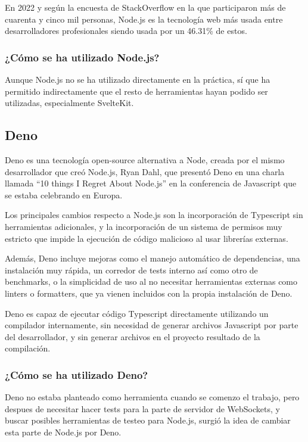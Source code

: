 En 2022 y según la encuesta de StackOverflow \cite{so_survey} en la que participaron más de cuarenta y cinco mil personas, Node.js es la tecnología web más usada entre desarrolladores profesionales siendo usada por un 46.31\% de estos.

\subsubsection{¿Cómo se ha utilizado Node.js?}
Aunque Node.js no se ha utilizado directamente en la práctica, sí que ha permitido indirectamente que el resto de herramientas hayan podido ser utilizadas, especialmente SvelteKit.


\subsection{Deno}
Deno \cite{deno_docs} es una tecnología open-source alternativa a Node, creada por el mismo desarrollador que creó Node.js, Ryan Dahl, que presentó Deno en una charla llamada “10 things I Regret About Node.js” en la conferencia de Javascript que se estaba celebrando en Europa.

Los principales cambios respecto a Node.js son la incorporación de Typescript sin herramientas adicionales, y la incorporación de un sistema de permisos muy estricto que impide la ejecución de código malicioso al usar librerías externas.

Además, Deno incluye mejoras como el manejo automático de dependencias, una instalación muy rápida, un corredor de tests interno así como otro de benchmarks, o la simplicidad de uso al no necesitar herramientas externas como linters o formatters, que ya vienen incluidos con la propia instalación de Deno.

Deno es capaz de ejecutar código Typescript directamente utilizando un compilador internamente, sin necesidad de generar archivos Javascript por parte del desarrollador, y sin generar archivos en el proyecto resultado de la compilación.

\subsubsection{¿Cómo se ha utilizado Deno?}
Deno no estaba planteado como herramienta cuando se comenzo el trabajo, pero despues de necesitar hacer tests para la parte de servidor de WebSockets, y buscar posibles herramientas de testeo para Node.js, surgió la idea de cambiar esta parte de Node.js por Deno.

